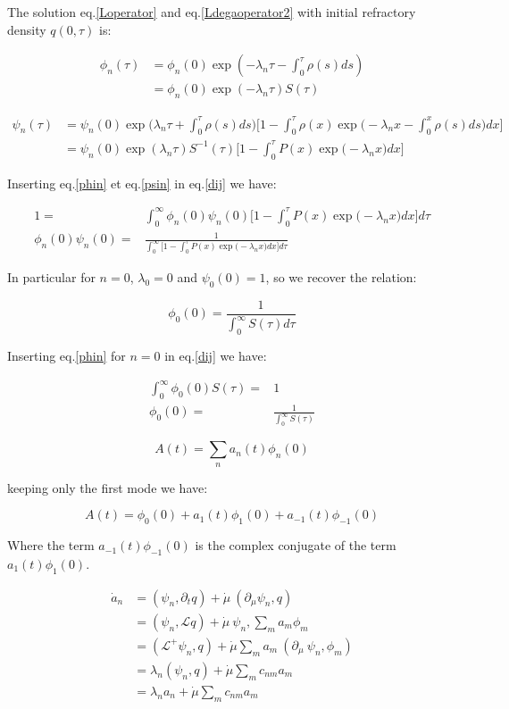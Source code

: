 \documentclass[a4paper,12pt,twoside]{article}
\def \be {\begin{equation}}
\def \ee {\end{equation}}
\begin{document}
The solution eq.\eqref{Loperator}  and eq.\eqref{Ldegaoperator2} with initial refractory density $q(0,\tau)$ is:

\begin{align}
\label{phin}
\phi_n(\tau)&=\phi_n(0)\exp(-\lambda_n\tau-\int_0^\tau\rho(s)ds)\nonumber\\
				  &=\phi_n(0)\exp(-\lambda_n\tau)S(\tau)
\end{align}

\begin{align}
\label{psin}
\psi_n(\tau)&=\psi_n(0)\exp\big(\lambda_n\tau+\int_0^\tau\rho(s)ds\big)\nonumber\big[1-\int^\tau_0 \rho(x) \exp\big(-\lambda_nx-\int_0^x\rho(s)ds\big)dx\big]\\
&=\psi_n(0)\exp(\lambda_n\tau)S^{-1}(\tau)\big[1-\int^\tau_0 P(x) \exp\big(-\lambda_nx)dx\big]
\end{align}



Inserting eq.\eqref{phin} et eq.\eqref{psin} in eq.\ref{dij} we have:

\begin{align}
1=&\int_0^{\infty}\phi_n(0)\psi_n(0)\big[1-\int^\tau_0 P(x) \exp\big(-\lambda_nx)dx\big]d\tau \\
\phi_n(0)\psi_n(0) =&\frac{1}{\int_0^{\infty}\big[1-\int^\tau_0 P(x) \exp\big(-\lambda_nx)dx\big]d\tau}
\end{align}

In particular for $n=0$, $\lambda_0=0$ and $\psi_0(0)=1$, so we recover the relation:

\be
\phi_0(0) = \frac{1}{\int_0^{\infty}S(\tau)d\tau}
\ee

Inserting eq.\eqref{phin} for $n=0$ in eq.\ref{dij} we have:

\begin{align}
\int_0^{\infty}\phi_0(0)S(\tau) =& 1 \\
\phi_0(0) =& \frac{1}{\int_0^{\infty}S(\tau)}
\end{align}

\be
A(t)=\sum_n a_n(t)\phi_n(0)
\ee

keeping only the first mode we have:

\be
A(t)=\phi_0(0) + a_1(t)\phi_1(0) +a_{-1}(t)\phi_{-1}(0)
\ee

Where the term $a_{-1}(t)\phi_{-1}(0)$ is the complex conjugate  of the term $a_1(t)\phi_1(0)$. 


\begin{align}
\dot{a}_n&=(\psi_n,\partial_tq) + \dot{\mu}\: (\partial_{\mu}\psi_n,q)   \nonumber \\
&=(\psi_n,\mathcal{L}q)  +   \dot{\mu}\:\psi_n,\sum_ma_m\phi_m\nonumber \\
&=(\mathcal{L}^+\psi_n,q)+ \dot{\mu}\sum_ma_m\:(\partial_{\mu}\:\psi_n,\phi_m) \nonumber \\
&=\lambda_n(\psi_n,q) +  \dot{\mu}\sum_mc_{nm}a_m \nonumber \\
&=\lambda_na_n   +  \dot{\mu}\sum_mc_{nm}a_m
\end{align}
\end{document}
